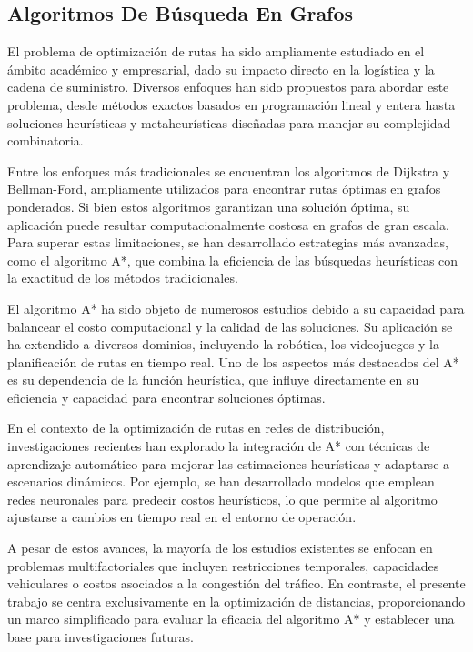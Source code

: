 \documentclass[conference]{IEEEtran}
\begin{document}
	\subsection{Algoritmos De Búsqueda En Grafos}\label{AA}
	El problema de optimización de rutas ha sido ampliamente estudiado en el ámbito académico y empresarial, dado su impacto directo en la logística y la cadena de suministro. Diversos enfoques han sido propuestos para abordar este problema, desde métodos exactos basados en programación lineal y entera hasta soluciones heurísticas y metaheurísticas diseñadas para manejar su complejidad combinatoria. 
	
	Entre los enfoques más tradicionales se encuentran los algoritmos de Dijkstra y Bellman-Ford, ampliamente utilizados para encontrar rutas óptimas en grafos ponderados. Si bien estos algoritmos garantizan una solución óptima, su aplicación puede resultar computacionalmente costosa en grafos de gran escala. Para superar estas limitaciones, se han desarrollado estrategias más avanzadas, como el algoritmo A*, que combina la eficiencia de las búsquedas heurísticas con la exactitud de los métodos tradicionales.
	
	El algoritmo A* ha sido objeto de numerosos estudios debido a su capacidad para balancear el costo computacional y la calidad de las soluciones. Su aplicación se ha extendido a diversos dominios, incluyendo la robótica, los videojuegos y la planificación de rutas en tiempo real. Uno de los aspectos más destacados del A* es su dependencia de la función heurística, que influye directamente en su eficiencia y capacidad para encontrar soluciones óptimas.
	
	En el contexto de la optimización de rutas en redes de distribución, investigaciones recientes han explorado la integración de A* con técnicas de aprendizaje automático para mejorar las estimaciones heurísticas y adaptarse a escenarios dinámicos. Por ejemplo, se han desarrollado modelos que emplean redes neuronales para predecir costos heurísticos, lo que permite al algoritmo ajustarse a cambios en tiempo real en el entorno de operación.
	
	A pesar de estos avances, la mayoría de los estudios existentes se enfocan en problemas multifactoriales que incluyen restricciones temporales, capacidades vehiculares o costos asociados a la congestión del tráfico. En contraste, el presente trabajo se centra exclusivamente en la optimización de distancias, proporcionando un marco simplificado para evaluar la eficacia del algoritmo A* y establecer una base para investigaciones futuras.
	
\end{document}
